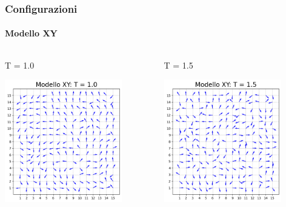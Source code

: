 \begin{frame}
    \frametitle{Configurazioni}
    \framesubtitle{Modello XY}

    \begin{columns}
        \begin{column}{0.5\textwidth}
            \begin{block}{T = 1.0}

            \centering
            \includegraphics[width=0.8\textwidth]{Immagini/backupXY/conf_T1.0.png}

            \end{block}
        \end{column}
    
        \begin{column}{0.5\textwidth}
            \begin{block}{T = 1.5}

                \centering
                \includegraphics[width=0.8\textwidth]{Immagini/backupXY/conf_T1.5.png}


\end{block}
\end{column}
\end{columns}
\end{frame}
